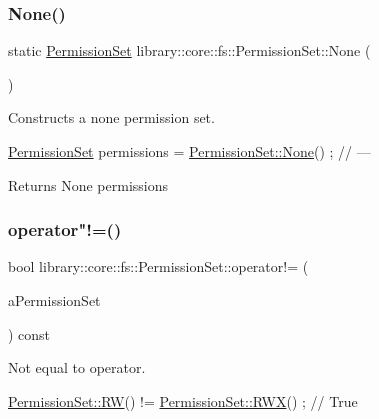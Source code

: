 \subsubsection{\texorpdfstring{None()}{None()}}
{\footnotesize\ttfamily static \hyperlink{classlibrary_1_1core_1_1fs_1_1PermissionSet}{Permission\+Set} library\+::core\+::fs\+::\+Permission\+Set\+::\+None (\begin{DoxyParamCaption}{ }\end{DoxyParamCaption})\hspace{0.3cm}{\ttfamily [static]}}



Constructs a none permission set. 


\begin{DoxyCode}
\hyperlink{classlibrary_1_1core_1_1fs_1_1PermissionSet_a8a6eb39cc2a8bca92a657d065d3e36ba}{PermissionSet} permissions = \hyperlink{classlibrary_1_1core_1_1fs_1_1PermissionSet_af590f297c53ba55474f8d5b78bc45b62}{PermissionSet::None}() ; \textcolor{comment}{// ---}
\end{DoxyCode}


\begin{DoxyReturn}{Returns}
None permissions 
\end{DoxyReturn}
\mbox{\label{classlibrary_1_1core_1_1fs_1_1PermissionSet_a7549184997b592bb790ccad3e9084a19}} 
\subsubsection{\texorpdfstring{operator"!=()}{operator!=()}}
{\footnotesize\ttfamily bool library\+::core\+::fs\+::\+Permission\+Set\+::operator!= (\begin{DoxyParamCaption}\item[{const \hyperlink{classlibrary_1_1core_1_1fs_1_1PermissionSet}{Permission\+Set} \&}]{a\+Permission\+Set }\end{DoxyParamCaption}) const}



Not equal to operator. 


\begin{DoxyCode}
\hyperlink{classlibrary_1_1core_1_1fs_1_1PermissionSet_a9722204cdc11a0171e1a115d449a134b}{PermissionSet::RW}() != \hyperlink{classlibrary_1_1core_1_1fs_1_1PermissionSet_afa3f9d07a7053240ae97c587543cdb00}{PermissionSet::RWX}() ; \textcolor{comment}{// True}
\end{DoxyCode}




